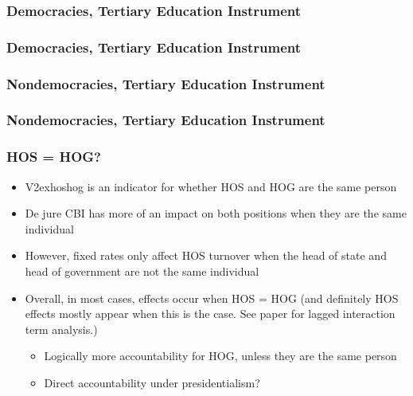 \documentclass{beamer}
\begin{document}
    \begin{frame}
        \frametitle{Democracies, Tertiary Education Instrument}
        {
            \let\oldcentering\centering
            \renewcommand\centering{\tiny\oldcentering}
            
        }
    \end{frame}

    \begin{frame}
        \frametitle{Democracies, Tertiary Education Instrument}
        {
            \let\oldcentering\centering
            \renewcommand\centering{\tiny\oldcentering}
            
        }
    \end{frame}

    \begin{frame}
        \frametitle{Nondemocracies, Tertiary Education Instrument}
        {
            \let\oldcentering\centering
            \renewcommand\centering{\tiny\oldcentering}
            
        }
    \end{frame}

    \begin{frame}
        \frametitle{Nondemocracies, Tertiary Education Instrument}
        {
            \let\oldcentering\centering
            \renewcommand\centering{\tiny\oldcentering}
            
        }
    \end{frame}

    \begin{frame}
        \frametitle{HOS = HOG?}
        \begin{itemize}
            \item V2exhoshog is an indicator for whether HOS and HOG are the same person
            \item De jure CBI has more of an impact on both positions when they are the same individual
            \item However, fixed rates only affect HOS turnover when the head of state and head of government are not the same individual
            \item Overall, in most cases, effects occur when HOS = HOG (and definitely HOS effects mostly appear when this is the case. See paper for lagged interaction term analysis.)
            \begin{itemize}
                \item Logically more accountability for HOG, unless they are the same person
                \item Direct accountability under presidentialism?
            \end{itemize}
        \end{itemize}
    \end{frame}
\end{document}
